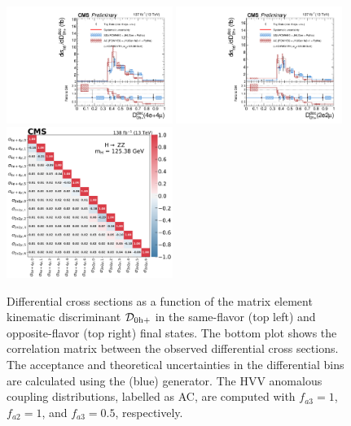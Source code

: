 \clearpage

\begin{center}
	\begin{figure}[!htb]
		\centering
		\includegraphics[width=0.48\textwidth]{Images/H4L/discriminants/model_v4/D0hp_unfoldwith_4l_SM_125_asimov.pdf}
		\includegraphics[width=0.48\textwidth]{Images/H4L/discriminants/model_v4/D0hp_unfoldwith_2e2mu_SM_125_asimov.pdf}\\
		\includegraphics[width=0.48\textwidth]{Images/H4L/correlations/corr_D0hp_v4.pdf}\\
		\caption{
			Differential cross sections as a function of the matrix element kinematic discriminant ${\mathcal D}_{\text{0h+}}$ in the same-flavor (top left) and opposite-flavor (top right)  final states.
			The bottom plot shows the correlation matrix between the observed differential cross sections.
			The acceptance and theoretical uncertainties in the differential bins are calculated using the \POWHEG (blue) generator.
			The HVV anomalous coupling distributions, labelled as AC, are computed with $f_{a3} = 1$, $f_{a2} = 1$, and $f_{a3} = 0.5$, respectively.
			\label{fig:fidDOHP}}
	\end{figure}
\end{center}

